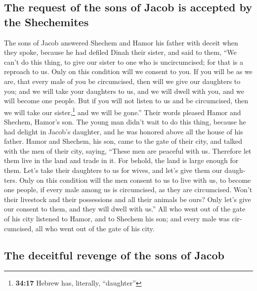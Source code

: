 \begin{paracol}{2}
\begin{otherlanguage}{english}
\hypertarget{the-request-of-the-sons-of-jacob-is-accepted-by-the-shechemites}{%
\subsection{The request of the sons of Jacob is accepted by the
Shechemites}\label{the-request-of-the-sons-of-jacob-is-accepted-by-the-shechemites}}

 The sons of Jacob answered Shechem and Hamor his father
with deceit when they spoke, because he had defiled Dinah their sister,
 and said to them, ``We can't do this thing, to give our
sister to one who is uncircumcised; for that is a reproach to us.
 Only on this condition will we consent to you. If you
will be as we are, that every male of you be circumcised,
 then will we give our daughters to you; and we will take
your daughters to us, and we will dwell with you, and we will become one
people.  But if you will not listen to us and be
circumcised, then we will take our sister,\footnote{\textbf{34:17}
  Hebrew has, literally, ``daughter''} and we will be gone.''
 Their words pleased Hamor and Shechem, Hamor's son.
 The young man didn't wait to do this thing, because he
had delight in Jacob's daughter, and he was honored above all the house
of his father.  Hamor and Shechem, his son, came to the
gate of their city, and talked with the men of their city, saying,
 ``These men are peaceful with us. Therefore let them
live in the land and trade in it. For behold, the land is large enough
for them. Let's take their daughters to us for wives, and let's give
them our daughters.  Only on this condition will the men
consent to us to live with us, to become one people, if every male among
us is circumcised, as they are circumcised.  Won't their
livestock and their possessions and all their animals be ours? Only
let's give our consent to them, and they will dwell with us.''
 All who went out of the gate of his city listened to
Hamor, and to Shechem his son; and every male was circumcised, all who
went out of the gate of his city.

\hypertarget{the-deceitful-revenge-of-the-sons-of-jacob}{%
\subsection{The deceitful revenge of the sons of
Jacob}\label{the-deceitful-revenge-of-the-sons-of-jacob}}


\end{otherlanguage}
\end{paracol}
